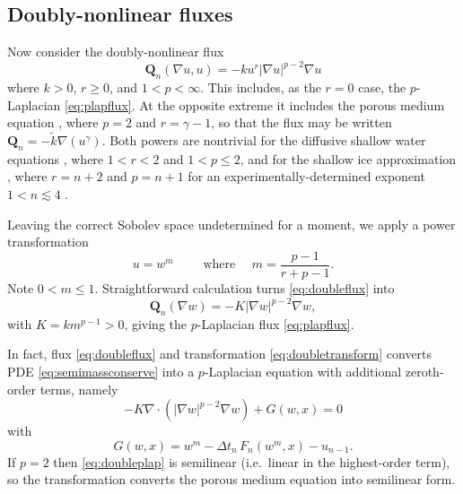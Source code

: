 \documentclass[final,leqno,onefignum,onetabnum]{siamltex1213bueler}
\newcommand\bQ{\mathbf{Q}}
\newcommand{\Div}{\nabla\cdot}
\renewcommand{\grad}{\nabla}
\begin{document}
\subsection{Doubly-nonlinear fluxes} \label{subsec:powertransform}  Now consider the doubly-nonlinear \cite{Raviart1970} flux
\begin{equation}
  \bQ_n(\grad u,u) = - k u^r |\grad u|^{p-2} \grad u \label{eq:doubleflux}
\end{equation}
where $k>0$, $r\ge 0$, and $1<p<\infty$.  This includes, as the $r=0$ case, the $p$-Laplacian \eqref{eq:plapflux}.  At the opposite extreme it includes the porous medium equation \cite{Vazquez2007}, where $p=2$ and $r=\gamma-1$, so that the flux may be written $\bQ_n = - \tilde k \grad(u^\gamma)$.  Both powers are nontrivial for the diffusive shallow water equations \cite{AlonsoSantillanaDawson2008}, where $1<r<2$ and $1<p\le 2$, and for the shallow ice approximation \cite{Bueleretal2005,Calvoetal2002,JouvetBueler2012}, where $r=n+2$ and $p=n+1$ for an experimentally-determined exponent $1 < n \lesssim 4$ \cite{GoldsbyKohlstedt2001}.

Leaving the correct Sobolev space undetermined for a moment, we apply a power transformation
\begin{equation}
	u = w^m \qquad \text{ where } \quad m = \frac{p-1}{r+p-1}. \label{eq:doubletransform}
\end{equation}
Note $0 < m \le 1$.  Straightforward calculation turns \eqref{eq:doubleflux} into
\begin{equation}
	\bQ_n(\grad w) = - K |\grad w|^{p-2} \grad w, \label{eq:doublenewflux}
\end{equation}
with $K=k m^{p-1}>0$, giving the $p$-Laplacian flux \eqref{eq:plapflux}.

In fact, flux \eqref{eq:doubleflux} and transformation  \eqref{eq:doubletransform} converts PDE \eqref{eq:semimassconserve} into a $p$-Laplacian equation with additional zeroth-order terms, namely
\begin{equation}
    - K \Div\left(|\grad w|^{p-2} \grad w\right) + G(w,x) = 0  \label{eq:doubleplap}
\end{equation}
with
\begin{equation}
   G(w,x) = w^m - \Delta t_n\, F_n(w^m,x) - u_{n-1}. \label{eq:doubleGdefn}
\end{equation}
If $p=2$ then \eqref{eq:doubleplap} is semilinear (i.e.~linear in the highest-order term), so the transformation converts the porous medium equation into semilinear form.
\end{document}
